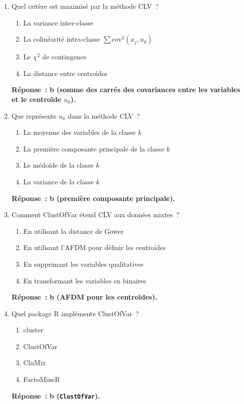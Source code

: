 \documentclass[a4paper,11pt]{article}
\theoremstyle{definition}
\theoremstyle{remark}
\begin{document}
\begin{enumerate}
  \item Quel crit\`ere est maximis\'e par la m\'ethode CLV~?
    \begin{enumerate}
      \item La variance inter-classe
      \item La colin\'earit\'e intra-classe $\sum \text{cov}^2(x_j, u_k)$
      \item Le $\chi^2$ de contingence
      \item La distance entre centro\"ides
    \end{enumerate}
    \textbf{R\'eponse~: b (somme des carr\'es des covariances entre
    les variables et le centro\"ide $u_k$).}

  \item Que repr\'esente $u_k$ dans la m\'ethode CLV~?
    \begin{enumerate}
      \item La moyenne des variables de la classe $k$
      \item La premi\`ere composante principale de la classe $k$
      \item Le m\'edo\"ide de la classe $k$
      \item La variance de la classe $k$
    \end{enumerate}
    \textbf{R\'eponse~: b (premi\`ere composante principale).}

  \item Comment ClustOfVar \'etend CLV aux donn\'ees mixtes~?
    \begin{enumerate}
      \item En utilisant la distance de Gower
      \item En utilisant l'AFDM pour d\'efinir les centro\"ides
      \item En supprimant les variables qualitatives
      \item En transformant les variables en binaires
    \end{enumerate}
    \textbf{R\'eponse~: b (AFDM pour les centro\"ides).}

  \item Quel package R impl\'emente ClustOfVar~?
    \begin{enumerate}
      \item cluster
      \item ClustOfVar
      \item CluMix
      \item FactoMineR
    \end{enumerate}
    \textbf{R\'eponse~: b (\texttt{ClustOfVar}).}


\end{enumerate}
\end{document}
